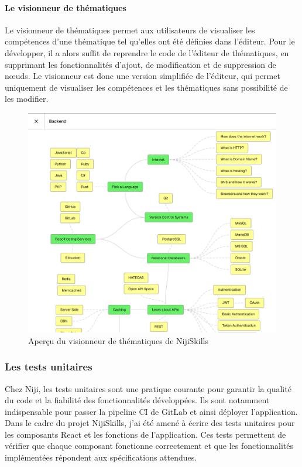 \documentclass[12pt]{article}
\begin{document}
\paragraph{Le visionneur de thématiques\\}
Le visionneur de thématiques permet aux utilisateurs de visualiser les compétences d'une thématique tel qu'elles ont été définies dans l'éditeur. Pour le développer, il a alors suffit de reprendre le code de l'éditeur de thématiques, en supprimant les fonctionnalités d'ajout, de modification et de suppression de nœuds. Le visionneur est donc une version simplifiée de l'éditeur, qui permet uniquement de visualiser les compétences et les thématiques sans possibilité de les modifier.
\\
\begin{figure}[h!]
    \centering
    \includegraphics[width=0.95\linewidth]{img/nijiskills-view.png}
    \caption{Aperçu du visionneur de thématiques de NijiSkills}
\end{figure}
\newpage
\subsubsection{Les tests unitaires}
Chez Niji, les tests unitaires sont une pratique courante pour garantir la qualité du code et la fiabilité des fonctionnalités développées. Ils sont notamment indispensable pour passer la pipeline CI de GitLab et ainsi déployer l'application. Dans le cadre du projet NijiSkills, j'ai été amené à écrire des tests unitaires pour les composants React et les fonctions de l'application. Ces tests permettent de vérifier que chaque composant fonctionne correctement et que les fonctionnalités implémentées répondent aux spécifications attendues.
\end{document}
